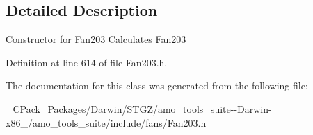 \subsection{Detailed Description}
Constructor for \hyperlink{class_fan203}{Fan203} Calculates \hyperlink{class_fan203}{Fan203} 

Definition at line 614 of file Fan203.\+h.



The documentation for this class was generated from the following file\+:\begin{DoxyCompactItemize}
\item 
\+\_\+\+C\+Pack\+\_\+\+Packages/\+Darwin/\+S\+T\+G\+Z/amo\+\_\+tools\+\_\+suite-\/-\/\+Darwin-\/x86\+\_/amo\+\_\+tools\+\_\+suite/include/fans/Fan203.\+h\end{DoxyCompactItemize}
